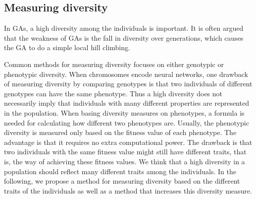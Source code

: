 
\subsection{Measuring diversity}
In GAs, a high diversity among the individuals is important.
It is often argued that the weakness of GAs is the fall in diversity over generations, which causes the GA to do a simple local hill climbing.

Common methods for measuring diversity focuses on either genotypic or phenotypic diversity.
When chromosomes encode neural networks, one drawback of measuring diversity by comparing genotypes is that two individuals of different genotypes can have the same phenotype. Thus a high diversity does not necessarily imply that individuals with many different properties are represented in the population.
When basing diversity measures on phenotypes, a formula is needed for calculating how different two phenotypes are. 
Usually, the phenotypic diversity is measured only based on the fitness value of each phenotype.
The advantage is that it requires no extra computational power. 
The drawback is that two individuals with the same fitness value might still have different traits, that is, the way of achieving these fitness values. We think that a high diversity in a population should reflect many different traits among the individuals. In the following, we propose a method for measuring diversity based on the different traits of the individuals as well as a method that increases this diversity measure. 
